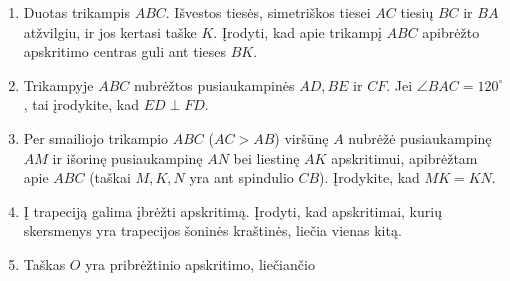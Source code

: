 \begin{enumerate}
  \item Duotas trikampis $ABC$. Išvestos tiesės, simetriškos
    tiesei $AC$ tiesių $BC$ ir $BA$ atžvilgiu, ir jos kertasi
    taške $K$. Įrodyti, kad apie trikampį $ABC$ apibrėžto
    apskritimo centras guli ant tieses $BK$.
  \item Trikampyje $ABC$ nubrėžtos pusiaukampinės $AD, BE$ ir
    $CF$. Jei $\angle BAC=120^\circ$, tai įrodykite, kad
    $ED\perp FD$.
  \item Per smailiojo trikampio $ABC$ ($AC>AB$) viršūnę $A$
    nubrėžė pusiaukampinę $AM$ ir išorinę pusiaukampinę $AN$
    bei liestinę $AK$ apskritimui, apibrėžtam apie $ABC$
    (taškai $M,K,N$ yra ant spindulio $CB$). Įrodykite, kad
    $MK=KN$. 
  \item Į trapeciją galima įbrėžti apskritimą. Įrodyti, kad
    apskritimai, kurių skersmenys yra trapecijos šoninės
    kraštinės, liečia vienas kitą.
  \item Taškas $O$ yra pribrėžtinio apskritimo, liečiančio

\end{enumerate}

